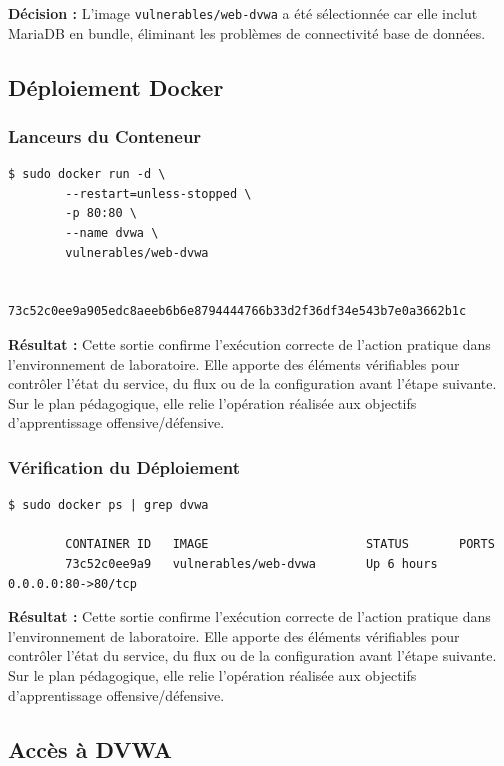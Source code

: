 \documentclass[12pt,a4paper,openany]{report}
\begin{document}
	\textbf{Décision :} L'image \texttt{vulnerables/web-dvwa} a été sélectionnée car elle inclut MariaDB
	en bundle, éliminant les problèmes de connectivité base de données.
	
	\subsection{Déploiement Docker}
	
	\subsubsection{Lanceurs du Conteneur}
	
	\begin{lstlisting}[caption=Démarrage du Conteneur DVWA]
		$ sudo docker run -d \
		--restart=unless-stopped \
		-p 80:80 \
		--name dvwa \
		vulnerables/web-dvwa
		
		73c52c0ee9a905edc8aeeb6b6e8794444766b33d2f36df34e543b7e0a3662b1c
	\end{lstlisting}
	
	\textbf{Résultat :} Cette sortie confirme l'exécution correcte de l'action pratique dans l'environnement de laboratoire. Elle apporte des éléments vérifiables pour contrôler l'état du service, du flux ou de la configuration avant l'étape suivante. Sur le plan pédagogique, elle relie l'opération réalisée aux objectifs d'apprentissage offensive/défensive.
	
	
	\subsubsection{Vérification du Déploiement}
	
	\begin{lstlisting}[caption=Vérification du Conteneur]
		$ sudo docker ps | grep dvwa
		
		CONTAINER ID   IMAGE                      STATUS       PORTS
		73c52c0ee9a9   vulnerables/web-dvwa       Up 6 hours   0.0.0.0:80->80/tcp
	\end{lstlisting}
	
	\textbf{Résultat :} Cette sortie confirme l'exécution correcte de l'action pratique dans l'environnement de laboratoire. Elle apporte des éléments vérifiables pour contrôler l'état du service, du flux ou de la configuration avant l'étape suivante. Sur le plan pédagogique, elle relie l'opération réalisée aux objectifs d'apprentissage offensive/défensive.
	
	
	\subsection{Accès à DVWA}
	
\end{document}
